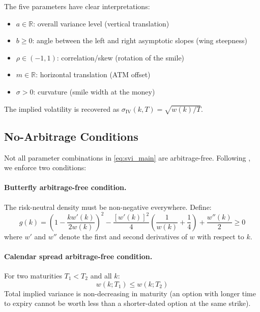 \documentclass[12pt, letterpaper]{article}
\begin{document}
The five parameters have clear interpretations:
\begin{itemize}
  \item $a \in \mathbb{R}$: overall variance level (vertical translation)
  \item $b \geq 0$: angle between the left and right asymptotic slopes (wing steepness)
  \item $\rho \in (-1, 1)$: correlation/skew (rotation of the smile)
  \item $m \in \mathbb{R}$: horizontal translation (ATM offset)
  \item $\sigma > 0$: curvature (smile width at the money)
\end{itemize}

The implied volatility is recovered as $\sigma_{\text{IV}}(k, T) = \sqrt{w(k)/T}$.

\subsection{No-Arbitrage Conditions}

Not all parameter combinations in \eqref{eq:svi_main} are arbitrage-free.
Following \citet{gatheral2014arbitrage}, we enforce two conditions:

\paragraph{Butterfly arbitrage-free condition.}
The risk-neutral density must be non-negative everywhere. Define:
\begin{equation}
  g(k) = \left(1 - \frac{k w'(k)}{2w(k)}\right)^2
         - \frac{[w'(k)]^2}{4}\left(\frac{1}{w(k)} + \frac{1}{4}\right)
         + \frac{w''(k)}{2} \geq 0
  \label{eq:butterfly}
\end{equation}
where $w'$ and $w''$ denote the first and second derivatives of $w$ with respect to $k$.

\paragraph{Calendar spread arbitrage-free condition.}
For two maturities $T_1 < T_2$ and all $k$:
\begin{equation}
  w(k; T_1) \leq w(k; T_2)
  \label{eq:calendar}
\end{equation}
Total implied variance is non-decreasing in maturity (an option with longer
time to expiry cannot be worth less than a shorter-dated option at the same strike).
\end{document}

